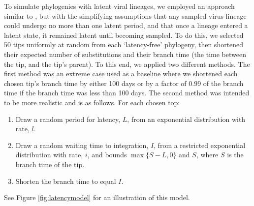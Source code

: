 \documentclass[12pt]{article}
\begin{document}

To simulate phylogenies with latent viral lineages, we employed an approach similar to \cite{Immonen14}, but with the simplifying assumptions that any sampled virus lineage could undergo no more than one latent period, and that once a lineage entered a latent state, it remained latent until becoming sampled.
To do this, we selected 50 tips uniformly at random from each `latency-free' phylogeny, then shortened their expected number of substitutions and their branch time (the time between the tip, and the tip's parent).
To this end, we applied two different methods.
The first method was an extreme case used as a baseline where we shortened each chosen tip's branch time by either 100 days or by a factor of $0.99$ of the branch time if the branch time was less than 100 days.
The second method was intended to be more realistic and is as follows. For each chosen top:
\begin{enumerate}
\item Draw a random period for latency, $L$, from an exponential distribution with rate, $l$.
\item Draw a random waiting time to integration, $I$, from a restricted exponential distribution with rate, $i$, and bounds $\max\{S-L, 0\}$ and $S$, where $S$ is the branch time of the tip.
\item Shorten the branch time to equal $I$.
\end{enumerate}
See Figure \ref{fig:latencymodel} for an illustration of this model.
\end{document}
